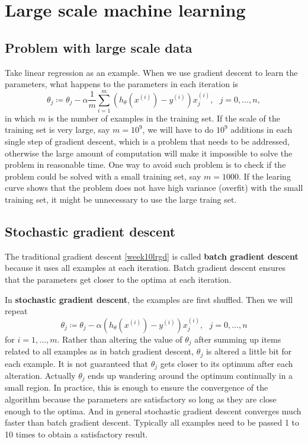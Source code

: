 \ifx\PREAMBLE\undefined


\fi
\section{Large scale machine learning}
\subsection{Problem with large scale data}
Take linear regression as an example. When we use gradient descent to learn the parameters, what happens to the parameters in each iteration is
\begin{equation}\label{week10lrgd}
\theta_j \coloneqq \theta_j-\alpha\frac{1}{m}\sum\limits_{i=1}^m(h_{\theta}(x^{(i)}) - y^{(i)})x^{(i)}_j,\text{ }j=0,\dots,n,
\end{equation}
in which $m$ is the number of examples in the training set. If the scale of the training set is very large, say $m=10^9$, we will have to do $10^9$ additions in each single step of gradient descent, which is a problem that needs to be addressed, otherwise the large amount of computation will make it impossible to solve the problem in reasonable time. One way to avoid such problem is to check if the problem could be solved with a small training set, say $m=1000$. If the learing curve shows that the problem does not have high variance (overfit) with the small training set, it might be unnecessary to use the large traing set.
\subsection{Stochastic gradient descent}
The traditional gradient descent \eqref{week10lrgd} is called {\bf batch gradient descent} because it uses all examples at each iteration. Batch gradient descent ensures that the parameters get closer to the optima at each iteration.

In {\bf stochastic gradient descent}, the examples are first shuffled. Then we will repeat
\begin{equation}
\theta_j \coloneqq \theta_j-\alpha(h_{\theta}(x^{(i)}) - y^{(i)})x^{(i)}_j,\text{ }j=0,\dots,n
\end{equation}
for $i=1,\dots,m$. Rather than altering the value of $\theta_j$ after summing up items related to all examples as in batch gradient descent, $\theta_j$ is altered a little bit for each example. It is not guaranteed that $\theta_j$ gets closer to its optimum after each alteration. Actually $\theta_j$ ends up wandering around the optimum continually in a small region. In practice, this is enough to ensure the convergence of the algorithm because the parameters are satisfactory so long as they are close enough to the optima. And in general stochastic gradient descent converges much faster than batch gradient descent. Typically all examples need to be passed 1 to 10 times to obtain a satisfactory result.
